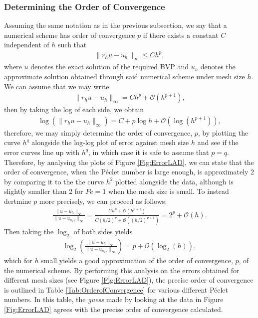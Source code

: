 \documentclass[a4paper,11pt]{article}
\theoremstyle{break}
\theoremstyle{break2}
\theoremstyle{break}
\theoremstyle{break2}
\newcommand{\cO}{\mathcal{O}}
\begin{document}
\subsubsection{Determining the Order of Convergence}
Assuming the same notation as in the previous subsection, we say that a numerical scheme has order of convergence $ p $ if there exists a constant $ C $ independent of $ h $ such that
\begin{align*}
\|r_hu - u_h\|_{\infty} \leq C h^p,
\end{align*}
where $ u $ denotes the exact solution of the required BVP and $ u_h $ denotes the approximate solution obtained through said numerical scheme under mesh size $ h $. We can assume that we may write
\begin{align*}
\|r_h u - u_h\|_{\infty} = Ch^p + \cO(h^{p+1}),
\end{align*}
then by taking the log of each side, we obtain
\begin{align*}
\log(\|r_hu - u_h\|_{\infty}) = C + p\log h + \cO(\log(h^{p+1})),
\end{align*}
therefore, we may simply determine the order of convergence, $ p $, by plotting the curve $ h^{q} $ alongside the log-log plot of error against mesh size $ h $ and see if the error curves line up with $ h^q $, in which case it is safe to assume that $ p = q $. Therefore, by analysing the plots of Figure \ref{Fig:ErrorLAD}, we can state that the order of convergence, when the P\'{e}clet number is large enough, is approximately $ 2 $ by comparing it to the the curve $ h^2 $ plotted alongside the data, although is slightly smaller than 2 for $ Pe = 1 $ when the mesh size is small. To instead dertmine $ p $ more precisely, we can proceed as follows:
\begin{align*}
\frac{\|u - u_{h}\|_{\infty}}{\|u-u_{h/2}\|_{\infty}} = \frac{C h^p + \cO(h^{p+1})}{C(h/2)^{p} + \cO((h/2)^{p+1})} = 2^p + \cO(h).
\end{align*}
Then taking the $ \log_2 $ of both sides yields
\begin{align*}
\log_2\left(\frac{\|u - u_{h}\|_{\infty}}{\|u-u_{h/2}\|_{\infty}}\right) = p + \cO(\log_2(h)),
\end{align*}
which for $ h $ small yields a good approximation of the order of convergence, $ p $, of the numerical scheme. By performing this analysis on the errors obtained for different mesh sizes (see Figure \ref{Fig:ErrorLAD}), the precise order of convergence is outlined in Table \ref{Tab:OrderofConvergence} for various different P\'{e}clet numbers. In this table, the \emph{guess} made by looking at the data in Figure \ref{Fig:ErrorLAD} agrees with the precise order of convergence calculated.
\end{document}
